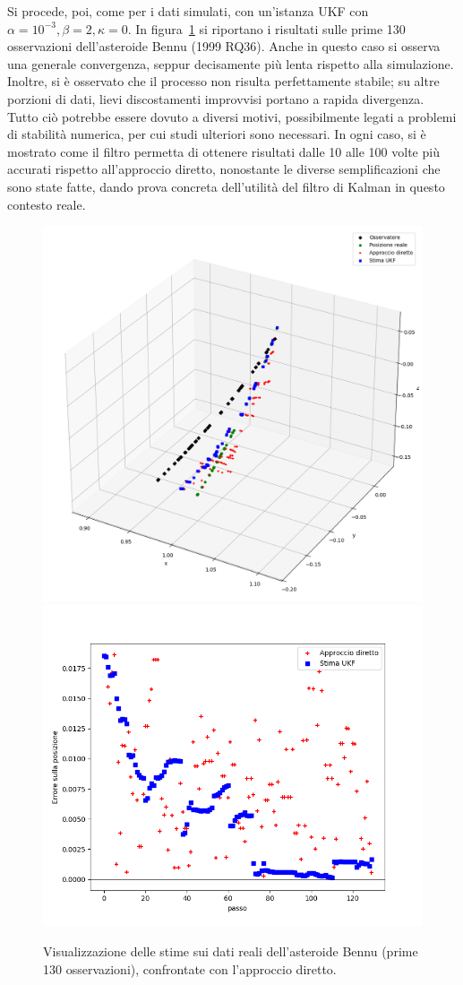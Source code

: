\documentclass[12pt,a4paper,openright,twoside]{book}
\begin{document}
Si procede, poi, come per i dati simulati, con un'istanza UKF con $\alpha=10^{-3},\beta=2,\kappa=0$. In figura~\ref{fig:Bennu130} si riportano i risultati sulle prime 130 osservazioni dell'asteroide Bennu (1999 RQ36). Anche in questo caso si osserva una generale convergenza, seppur decisamente più lenta rispetto alla simulazione. Inoltre, si è osservato che il processo non risulta perfettamente stabile; su altre porzioni di dati, lievi discostamenti improvvisi portano a rapida divergenza. Tutto ciò potrebbe essere dovuto a diversi motivi, possibilmente legati a problemi di stabilità numerica, per cui studi ulteriori sono necessari. In ogni caso, si è mostrato come il filtro permetta di ottenere risultati dalle 10 alle 100 volte più accurati rispetto all'approccio diretto, nonostante le diverse semplificazioni che sono state fatte, dando prova concreta dell'utilità del filtro di Kalman in questo contesto reale.

\begin{figure}
    \includegraphics[width=0.55\linewidth]{figures/Bennu_130_3d.png}
    \includegraphics[width=0.45\linewidth]{figures/Bennu_130_error.png}
    \caption{Visualizzazione delle stime sui dati reali dell'asteroide Bennu (prime 130 osservazioni), confrontate con l'approccio diretto.}
    \label{fig:Bennu130}
    \vspace{2\baselineskip}
\end{figure}
\end{document}
